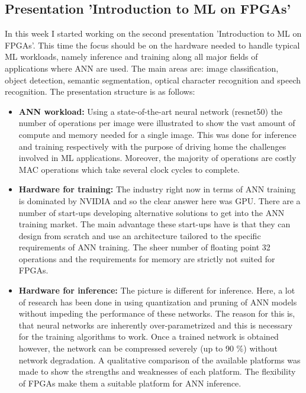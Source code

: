 \subsection{Presentation 'Introduction to \ac{ML} on \acp{FPGA}'}
In this week I started working on the second presentation 'Introduction to \ac{ML} on \acp{FPGA}'. This time the focus should be on the hardware needed to handle typical \ac{ML} workloads, namely inference and training along all major fields of applications where \ac{ANN} are used. The main areas are: image classification, object detection, semantic segmentation, optical character recognition and speech recognition. The presentation structure is as follows:
\begin{itemize}
	\item \textbf{\ac{ANN} workload:} Using a state-of-the-art neural network (resnet50) the number of operations per image were illustrated to show the vast amount of compute and memory needed for a single image. This was done for inference and training respectively with the purpose of driving home the challenges involved in \ac{ML} applications. Moreover, the majority of operations are costly \ac{MAC} operations which take several clock cycles to complete.
	\item \textbf{Hardware for training:} The industry right now in terms of \ac{ANN} training is dominated by NVIDIA and so the clear answer here was \ac{GPU}. There are a number of start-ups developing alternative solutions to get into the \ac{ANN} training market. The main advantage these start-ups have is that they can design from scratch and use an architecture tailored to the specific requirements of \ac{ANN} training. The sheer number of floating point 32 operations and the requirements for memory are strictly not suited for \acp{FPGA}.
	\item \textbf{Hardware for inference:} The picture is different for inference. Here, a lot of research has been done in using quantization and pruning of \ac{ANN} models without impeding the performance of these networks. The reason for this is, that neural networks are inherently over-parametrized and this is necessary for the training algorithms to work. Once a trained network is obtained however, the network can be compressed severely (up to 90 \%) without network degradation. A qualitative comparison of the available platforms was made to show the strengths and weaknesses of each platform. The flexibility of \acp{FPGA} make them a suitable platform for \ac{ANN} inference.

\end{itemize}
